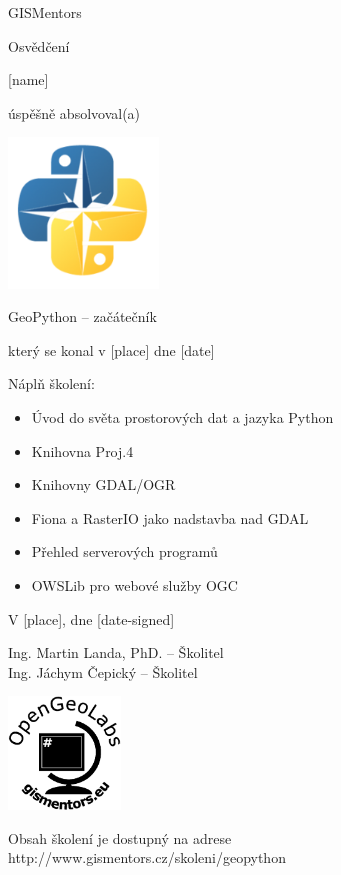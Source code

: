 \documentclass[12pt, a4paper]{letter}
\begin{document}
\pagestyle{empty}
\begin{center}

{\Large GISMentors}

{\Huge Osvědčení}

{\Large [name]}

úspěšně absolvoval(a)

\includegraphics[width=0.30\textwidth]{../images/geopython.png}

{\Large GeoPython -- začátečník}

který se konal v [place] dne [date]
\end{center}

Náplň školení:

\begin{itemize}
    \item Úvod do světa prostorových dat a jazyka Python
    \item Knihovna Proj.4
    \item Knihovny GDAL/OGR
    \item Fiona a RasterIO jako nadstavba nad GDAL
    \item Přehled serverových programů
    \item OWSLib pro webové služby OGC
\end{itemize}

\vfill
\parbox{7cm}{

    V [place], dne [date-signed]\\

\vfill

    Ing. Martin Landa, PhD. -- Školitel\\

\vfill
    Ing. Jáchym Čepický -- Školitel
}
\hfill
\parbox{3cm}{
    \includegraphics[width=3cm]{../images/placka.eps}
}

\vfill

\begin{center}
{\footnotesize Obsah školení je dostupný na adrese
http://www.gismentors.cz/skoleni/geopython}
\end{center}
\end{document}
